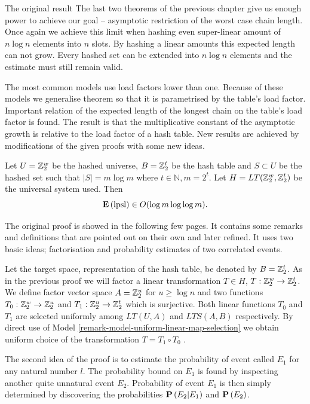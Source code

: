 \begin{section}{The original result}
The last two theorems of the previous chapter give us enough power to achieve our goal -- asymptotic restriction of the worst case chain length. Once again we achieve this limit when hashing even super-linear amount of $n \log n$ elements into $n$ slots. By hashing a linear amounts this expected length can not grow. Every hashed set can be extended into $n \log n$ elements and the estimate must still remain valid. 

The most common models use load factors lower than one. Because of these models we generalise theorem so that it is parametrised by the table's load factor. Important relation of the expected length of the longest chain on the table's load factor is found. The result is that the multiplicative constant of the asymptotic growth is relative to the load factor of a hash table. New results are achieved by modifications of the given proofs with some new ideas.

\begin{theorem}
\label{theorem-n-logn-to-n}
Let $U = \mathbb{Z}_{2}^{w}$ be the hashed universe, $B = \mathbb{Z}_{2}^{t}$ be the hash table and $S \subset U$ be the hashed set such that $|S| = m \log m$ where $t \in \mathbb{N}, m = 2 ^ t$. Let $H = LT(\mathbb{Z}_{2}^{w}, \mathbb{Z}_{2}^{t})$ be the universal system used. Then 
\[
	\mathbf{E}\left(\mathrm{lpsl}\right) \in O(\log m \log \log m) \text{.}
\]
\end{theorem}
The original proof is showed in the following few pages. It contains some remarks and definitions that are pointed out on their own and later refined. It uses two basic ideas; factorisation and probability estimates of two correlated events.

Let the target space, representation of the hash table, be denoted by $B = \mathbb{Z}_{2}^{t}$. As in the previous proof we will factor a linear transformation $T \in H$, $T: \mathbb{Z}_{2}^{w} \rightarrow \mathbb{Z}_{2}^{t}$. We define factor vector space $A = \mathbb{Z}_{2}^{u}$ for $u \geq \log n$ and two functions $T_0: \mathbb{Z}_{2}^{w} \rightarrow \mathbb{Z}_{2}^{u}$ and $T_1: \mathbb{Z}_{2}^{u} \rightarrow \mathbb{Z}_{2}^{t}$ which is surjective. Both linear functions $T_0$ and $T_1$ are selected uniformly among $LT(U, A)$ and $LTS(A, B)$ respectively. By direct use of Model \ref{remark-model-uniform-linear-map-selection} we obtain uniform choice of the transformation $T = T_1 \circ T_0$ .

The second idea of the proof is to estimate the probability of event called $E_1$ for any natural number $l$. The probability bound on $E_1$ is found by inspecting another quite unnatural event $E_2$. Probability of event $E_1$ is then simply determined by discovering the probabilities $\mathbf{P}\left(E_2 | E_1\right)$ and $\mathbf{P}\left(E_2\right)$.


\end{section}
